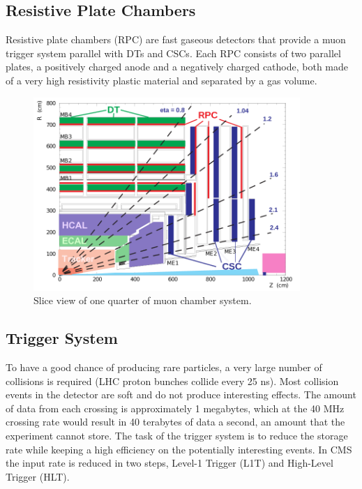 \subsection*{Resistive Plate Chambers}
Resistive plate chambers (RPC) are fast gaseous detectors that provide a muon trigger system parallel with DTs and CSCs. Each RPC consists of two parallel plates, a positively charged anode and a negatively charged cathode, both made of a very high resistivity plastic material and separated by a gas volume.

\begin{figure}[hbtp]
  \begin{center}
    \includegraphics[width=0.9\textwidth]{figure/CH2/MuonSys.png}
  \end{center}
  \caption{\label{fig:MuonSys}Slice view of one quarter of muon chamber system.}
\end{figure}

\subsection{Trigger System}

To have a good chance of producing rare particles, a very large number of collisions is required (LHC proton bunches collide every 25 ns). Most collision events in the detector are soft and do not produce interesting effects. The amount of data from each crossing is approximately 1 megabytes, which at the 40 MHz crossing rate would result in 40 terabytes of data a second, an amount that the experiment cannot store. The task of the trigger system is to reduce the storage rate while keeping a high efficiency on the potentially interesting events. In CMS the input rate is reduced in two steps, Level-1 Trigger (L1T) and High-Level Trigger (HLT).

